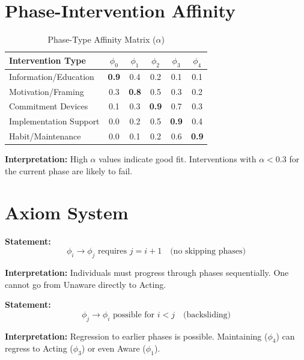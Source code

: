 \section{Phase-Intervention Affinity}
\label{sec:stage-affinity}

\begin{table}[htbp]
\centering
\caption{Phase-Type Affinity Matrix ($\alpha$)}
\label{tab:stage-affinity}
\renewcommand{\arraystretch}{1.3}
\begin{tabular}{@{}lccccc@{}}
\toprule
\textbf{Intervention Type} & $\phi_0$ & $\phi_1$ & $\phi_2$ & $\phi_3$ & $\phi_4$ \\
\midrule
Information/Education & \textbf{0.9} & 0.4 & 0.2 & 0.1 & 0.1 \\
Motivation/Framing & 0.3 & \textbf{0.8} & 0.5 & 0.3 & 0.2 \\
Commitment Devices & 0.1 & 0.3 & \textbf{0.9} & 0.7 & 0.3 \\
Implementation Support & 0.0 & 0.2 & 0.5 & \textbf{0.9} & 0.4 \\
Habit/Maintenance & 0.0 & 0.1 & 0.2 & 0.6 & \textbf{0.9} \\
\bottomrule
\end{tabular}
\end{table}

\textbf{Interpretation:} High $\alpha$ values indicate good fit. Interventions with
$\alpha < 0.3$ for the current phase are likely to fail.

\section{Axiom System}
\label{sec:stage-axioms}

\begin{tcolorbox}[colback=gray!5!white, colframe=gray!75!black,
    title=Axiom BCJ-1: Sequential Progression]
\textbf{Statement:}
\begin{equation}
\phi_i \to \phi_j \text{ requires } j = i + 1 \quad \text{(no skipping phases)}
\end{equation}

\textbf{Interpretation:} Individuals must progress through phases sequentially.
One cannot go from Unaware directly to Acting.
\end{tcolorbox}

\begin{tcolorbox}[colback=gray!5!white, colframe=gray!75!black,
    title=Axiom BCJ-2: Regression Possibility]
\textbf{Statement:}
\begin{equation}
\phi_j \to \phi_i \text{ possible for } i < j \quad \text{(backsliding)}
\end{equation}

\textbf{Interpretation:} Regression to earlier phases is possible. Maintaining
($\phi_4$) can regress to Acting ($\phi_3$) or even Aware ($\phi_1$).
\end{tcolorbox}


